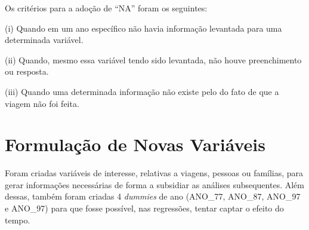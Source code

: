 \begin{table}[htb]
\end{table}

Os critérios para a adoção de ``NA'' foram os seguintes:

\begin{compactitem}[]
\item (i) Quando em um ano específico não havia informação levantada para uma determinada variável.
\item (ii) Quando, mesmo essa variável tendo sido levantada, não houve preenchimento ou resposta.
\item (iii) Quando uma determinada informação não existe pelo do fato de que a viagem não foi feita.
\end{compactitem}


\section{Formulação de Novas Variáveis}\label{sec:bd-novas-var}

Foram criadas variáveis de interesse, relativas a viagens, pessoas ou famílias, para gerar informações necessárias de forma a subsidiar as análises subsequentes. Além dessas, também foram criadas 4 \textit{dummies} de ano (ANO_77, ANO_87, ANO_97 e ANO_97) para que fosse possível, nas regressões, tentar captar o efeito do tempo.

